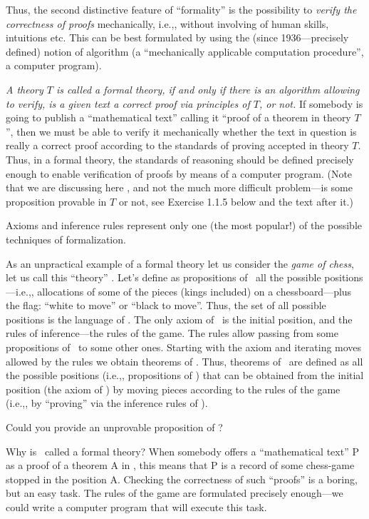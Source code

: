 Thus, the second distinctive feature of ``formality'' is the possibility to \emph{verify the correctness of proofs} mechanically, i.e.,, without involving of human skills, intuitions etc.
This can be best formulated by using the (since 1936---precisely defined) notion of algorithm (a ``mechanically applicable computation procedure'', a computer program).

\emph{A theory \(T\) is called a formal theory, if and only if there is an algorithm allowing to verify, is a given text a correct proof via principles of \(T\), or not.}
If somebody is going to publish a ``mathematical text'' calling it ``proof of a theorem in theory \(T\)'', then we must be able to verify it mechanically whether the text in question is really a correct proof according to the standards of proving accepted in theory \(T\).
Thus, in a formal theory, the standards of reasoning should be defined precisely enough to enable verification of proofs by means of a computer program.
(Note that we are discussing here , and not the much more difficult problem---is some proposition provable in \(T\) or not, see Exercise 1.1.5 below and the text after it.)

Axioms and inference rules represent only one (the most popular!) of the possible techniques of formalization.

As an unpractical example of a formal theory let us consider the \emph{game of chess}, let us call this ``theory'' \CHESS.
Let's define as propositions of \CHESS\ all the possible positions---i.e.,, allocations of some of the pieces (kings included) on a chessboard---plus the flag: ``white to move'' or ``black to move''.
Thus, the set of all possible positions is the language of \CHESS.
The only axiom of \CHESS\ is the initial position, and the rules of inference---the rules of the game.
The rules allow passing from some propositions of \CHESS\ to some other ones.
Starting with the axiom and iterating moves allowed by the rules we obtain theorems of \CHESS.
Thus, theorems of \CHESS\ are defined as all the possible positions (i.e.,, propositions of \CHESS) that can be obtained from the initial position (the axiom of \CHESS) by moving pieces according to the rules of the game (i.e.,, by ``proving'' via the inference rules of \CHESS).

\begin{exercise}
Could you provide an unprovable proposition of \CHESS?
\end{exercise}

Why is \CHESS\ called a formal theory? When somebody offers a ``mathematical text'' P as a proof of a theorem A in \CHESS, this means that P is a record of some chess-game stopped in the position A.
Checking the correctness of such ``proofs'' is a boring, but an easy task.
The rules of the game are formulated precisely enough---we could write a computer program that will execute this task.

